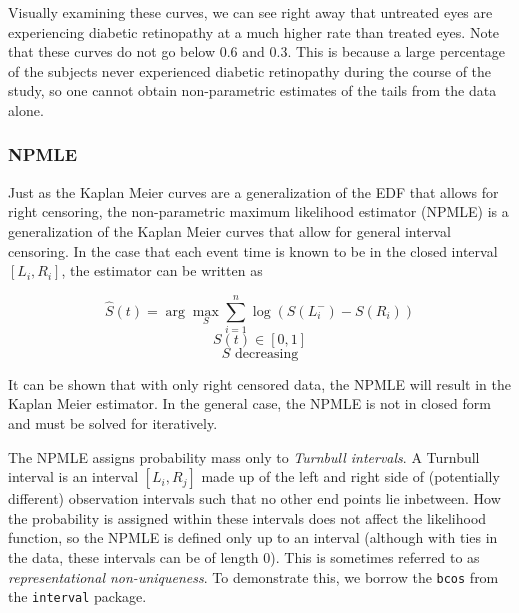 \documentclass[a4paper]{article}
\begin{document}
Visually examining these curves, we can see right away that untreated eyes are experiencing diabetic retinopathy at a much higher rate than treated eyes. Note that these curves do not go below 0.6 and 0.3. This is because a large percentage of the subjects never experienced diabetic retinopathy during the course of the study, so one cannot obtain non-parametric estimates of the tails from the data alone. 
    
    \subsubsection{NPMLE}
  
  Just as the Kaplan Meier curves are a generalization of the EDF that allows for right censoring, the non-parametric maximum likelihood estimator (NPMLE) is a generalization of the Kaplan Meier curves that allow for general interval censoring. In the case that each event time is known to be in the closed interval $[L_i, R_i]$, the estimator can be written as
  
\[
  \hat S(t) = \arg \max_S 
  \displaystyle
  \sum_{i = 1}^n \log(S(L_i^{-}) - S(R_i))
\]
\[
  S(t) \in [0,1]
\]
\[
  S \text{ decreasing}
\]

  It can be shown that with only right censored data, the NPMLE will result in the Kaplan Meier estimator. In the general case, the NPMLE is not in closed form and must be solved for iteratively. 

  The NPMLE assigns probability mass only to \emph{Turnbull intervals}. A Turnbull interval is an interval $[L_i, R_j]$ made up of the left and right side of (potentially different) observation intervals such that no other end points lie inbetween. How the probability is assigned within these intervals does not affect the likelihood function, so the NPMLE is defined only up to an interval (although with ties in the data, these intervals can be of length 0). This is sometimes referred to as \emph{representational non-uniqueness}. To demonstrate this, we borrow the \texttt{bcos} from the \texttt{interval} package. 
\end{document}
